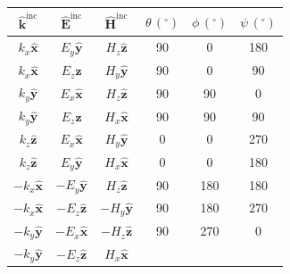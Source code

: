 \documentclass[onecolumn,a4paper]{article}
\numberwithin{equation}{section}
\begin{document}
\begin{table}[ht]
\begin{center}
\begin{tabular}{|c|c|c|c|c|c|}
\hline
$\hat{\mathbf{k}}^\mathrm{inc}$ &$\hat{\mathbf{E}}^\mathrm{inc}$ &$\hat{\mathbf{H}}^\mathrm{inc}$ 
&$\theta\,(^\circ)$             &$\phi\,(^\circ)$                &$\psi\,(^\circ)$                \\  
\hline
$k_x \hat{\mathbf{x}}$          &$E_y \hat{\mathbf{y}}$          &$H_z \hat{\mathbf{z}}$    
&90                             &0                               &180                             \\
$k_x \hat{\mathbf{x}}$          &$E_z \hat{\mathbf{z}}$          &$H_y \hat{\mathbf{y}}$    
&90                             &0                               &90                              \\
$k_y \hat{\mathbf{y}}$          &$E_x \hat{\mathbf{x}}$          &$H_z \hat{\mathbf{z}}$    
&90                             &90                              &0                               \\
$k_y \hat{\mathbf{y}}$          &$E_z \hat{\mathbf{z}}$          &$H_x \hat{\mathbf{x}}$    
&90                             &90                              &90                              \\
$k_z \hat{\mathbf{z}}$          &$E_x \hat{\mathbf{x}}$          &$H_y \hat{\mathbf{y}}$    
&0                              &0                               &270                             \\
$k_z \hat{\mathbf{z}}$          &$E_y \hat{\mathbf{y}}$          &$H_x \hat{\mathbf{x}}$    
&0                              &0                               &180                             \\
$-k_x \hat{\mathbf{x}}$         &$-E_y \hat{\mathbf{y}}$         &$H_z \hat{\mathbf{z}}$    
&90                             &180                             &180                             \\
$-k_x \hat{\mathbf{x}}$         &$-E_z \hat{\mathbf{z}}$         &$-H_y \hat{\mathbf{y}}$    
&90                             &180                             &270                             \\
$-k_y \hat{\mathbf{y}}$         &$-E_x \hat{\mathbf{x}}$         &$-H_z \hat{\mathbf{z}}$    
&90                             &270                             &0                               \\
$-k_y \hat{\mathbf{y}}$         &$-E_z \hat{\mathbf{z}}$         &$H_x \hat{\mathbf{x}}$    

\end{tabular}
\end{center}
\end{table}
\end{document}
